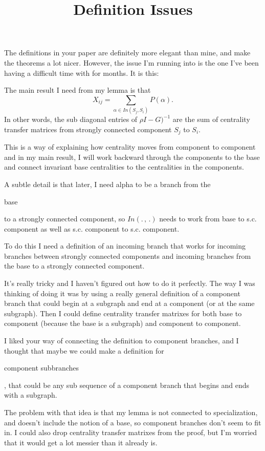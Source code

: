 \documentclass{paper}
\begin{document}
\title{Definition Issues}
\maketitle

The definitions in your paper are definitely more elegant than mine, and make the theorems a lot nicer. However, the issue I'm running into is the one I've been having a difficult time with for months. It is this:

The main result I need from my lemma is that 
\[ X_{ij} = \sum_{\alpha \in In(S_j,S_i)} P(\alpha ). \]
In other words, the sub diagonal entries of $\rho I-G)^{-1}$ are the sum of centrality transfer matrices from strongly connected component $S_j$ to $S_i$. 


This is a way of explaining how centrality moves from component to component and in my main result, I will work backward through the components to the base and connect invariant base centralities to the centralities in the components.


A subtle detail is that later, I need alpha to be a branch from the \begin{bf}base\end{bf} to a strongly connected component, so $In(.\, , \, .)$ needs to work from base to s.c. component as well as s.c. component to s.c. component.


To do this I need a definition of an incoming branch that works for incoming branches between strongly connected components and incoming branches from the base to a strongly connected component.


It's really tricky and I haven't figured out how to do it perfectly. The way I was thinking of doing it was by using a really general definition of a component branch that could begin at a subgraph and end at a component (or at the same subgraph). Then I could define centrality transfer matrixes for both base to component (because the base is a subgraph) and component to component.

I liked your way of connecting the definition to component branches, and I thought that maybe we could make a definition for \begin{it}component subbranches \end{it}, that could be any sub sequence of a component branch that begins and ends with a subgraph. 

The problem with that idea is that my lemma is not connected to specialization, and doesn't include the notion of a base, so component branches don't seem to fit in. I could also drop centrality transfer matrixes from the proof, but I'm worried that it would get a lot messier than it already is.
\end{document}

